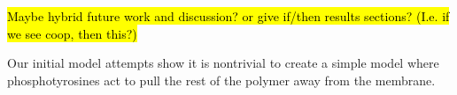 \documentclass[../../AdvancementSummary.tex]{subfiles}
\begin{document}
\hl{Maybe hybrid future work and discussion? or give if/then results sections?  (I.e. if we see coop, then this?)}

Our initial model attempts show it is nontrivial to create a simple model where phosphotyrosines act to pull the rest of the polymer away from the membrane.























\end{document}
